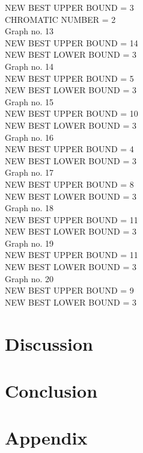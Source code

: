 \documentclass[a4paper]{report}
\begin{document}
	NEW BEST UPPER BOUND = 3\\
	CHROMATIC NUMBER = 2\\
	Graph no. 13\\
	NEW BEST UPPER BOUND = 14\\
	NEW BEST LOWER BOUND = 3\\
	Graph no. 14\\
	NEW BEST UPPER BOUND = 5\\
	NEW BEST LOWER BOUND = 3\\
	Graph no. 15\\
	NEW BEST UPPER BOUND = 10\\
	NEW BEST LOWER BOUND = 3\\
	Graph no. 16\\
	NEW BEST UPPER BOUND = 4\\
	NEW BEST LOWER BOUND = 3\\
	Graph no. 17\\
	NEW BEST UPPER BOUND = 8\\
	NEW BEST LOWER BOUND = 3\\
	Graph no. 18\\
	NEW BEST UPPER BOUND = 11\\
	NEW BEST LOWER BOUND = 3\\
	Graph no. 19\\
	NEW BEST UPPER BOUND = 11\\
	NEW BEST LOWER BOUND = 3\\
	Graph no. 20\\
	NEW BEST UPPER BOUND = 9\\
	NEW BEST LOWER BOUND = 3\\
	\chapter{Discussion}
	
	\chapter{Conclusion}
	
	
	
	
	
	\appendix
	\chapter*{Appendix}
\end{document}
